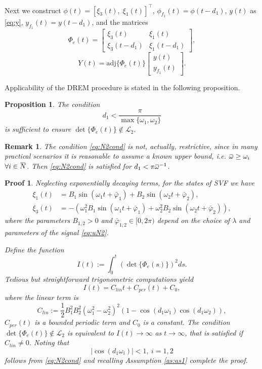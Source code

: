 \documentclass[journal, onecolumn]{IEEEtran}
\newtheorem{remark}{Remark}
\newtheorem{prop}{Proposition}
\newtheorem{pf}{Proof}
\newcommand{\overbar}[1]{\mkern 1.5mu\overline{\mkern-1.5mu#1\mkern-1.5mu}\mkern 1.5mu}
\newcommand{\iinb}{i\in\overbar{N}}
\begin{document}
Next we construct $\phi(t) =[\xi_3(t),\; \xi_1(t)]^\top$,  ${\phi_{f_1}(t) =\phi(t-d_1)}$, $y(t)$ as \eqref{eq:y}, $y_{f_1}(t) =y(t-d_1)$, and the matrices
\begin{equation}\label{eq:PhieN2}
	\Phi_e(t) = \begin{bmatrix}
	\xi_3(t) & \xi_1(t) \\ 
	\xi_3(t-d_1) & \xi_1(t-d_1)
	\end{bmatrix}, 
\end{equation}
\begin{equation*}
Y(t)=\mathrm{adj}\{\Phi_e(t)\} \begin{bmatrix} y(t) \\ y_{f_1}(t)\end{bmatrix}.
\end{equation*}


Applicability of the DREM procedure is stated in the following proposition.
\begin{prop} \label{prop:delN2}
The condition
\begin{equation} \label{eq:N2cond}
	d_1 < \frac{\pi}{\max\{\omega_1,\omega_2\}}
\end{equation}
is sufficient to ensure $\det\{\Phi_e(t)\} \notin \mathcal{L}_2$.\end{prop}
\begin{remark}
The condition \eqref{eq:N2cond} is not, actually, restrictive, since in many practical scenarios it is reasonable to assume a known upper bound, i.e. $\overbar{\omega}\ge\omega_i$ $\forall \iinb$. Then \eqref{eq:N2cond} is satisfied for $d_1<\pi\overbar{\omega}^{-1}$.
\end{remark}
\begin{pf}
Neglecting exponentially decaying terms, for the states of SVF we have
\[
	\begin{aligned}
		\xi_1(t) &= B_1\sin(\omega_1t+\bar{\varphi}_1) + B_2\sin(\omega_2 t +\bar{\varphi}_2), \\
		\xi_3(t) &= -\left(\omega_1^2 B_1\sin(\omega_1t+\bar{\varphi}_1) + \omega_2^2 B_2\sin(\omega_2 t +\bar{\varphi}_2)\right),
	\end{aligned}
\]
where the parameters $B_{1,2}>0$ and $\bar{\varphi}_{1,2}\in [0, 2\pi)$ depend on the choice of $\lambda$ and parameters of the signal \eqref{eq:uN2}.

Define the function
\[
	I(t) := \int_0^t{\left(\det\{\Phi_e(s)\}\right)^2 ds}.
\]
Tedious but straightforward trigonometric computations yield
\[
		I(t) = C_{lin}t + C_{per}(t) + C_0,
\] 
where the \emph{linear} term is
\[
	C_{lin}:=\frac{1}{2}B_1^2 B_2^2 (\omega_1^2-\omega_2^2)^2 \left(1-\cos(d_1\omega_1)\cos(d_1\omega_2)\right),
\]
$C_{per}(t)$ is a bounded periodic term and $C_0$ is a constant. The condition $\det\{\Phi_e(t)\} \notin \mathcal{L}_2$ is equivalent to $I(t) \to \infty$ as $t \to \infty$, that is satisfied if $C_{lin}\ne 0$. Noting that 
\[
	|\cos(d_1\omega_i)|<1, \ i=1,2
\]
follows from \eqref{eq:N2cond} and recalling Assumption \ref{as:as1} complete the proof. \end{pf}
\end{document}
